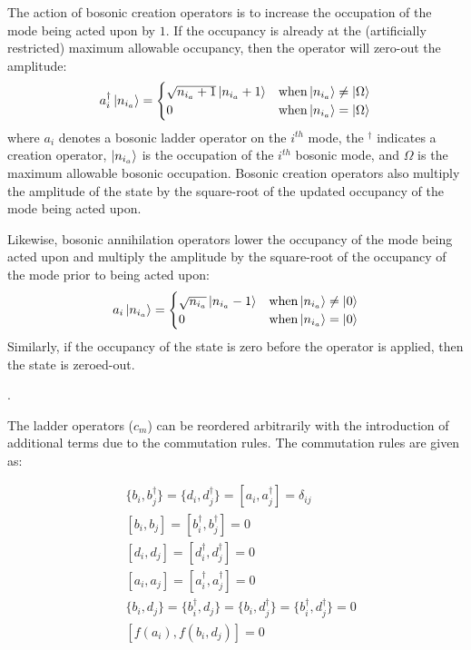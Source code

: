 The action of bosonic creation operators is to increase the occupation of the mode being acted upon by $1$.
If the occupancy is already at the (artificially restricted) maximum allowable occupancy, then the operator will zero-out the amplitude:
\begin{equation}
    \label{eq:bosonic-creation}
    a_i^\dagger \ket{n_{i_a}} = 
    \begin{cases} 
        \sqrt{n_{i_a} + 1} \ket{n_{i_a} + 1}  & {\rm when} \ket{n_{i_a}} \neq \ket{\Omega} \\
        0 & {\rm when} \ket{n_{i_a}} = \ket{\Omega}
    \end{cases}
\end{equation}
where $a_i$ denotes a bosonic ladder operator on the $i^{th}$ mode, the $^\dagger$ indicates a creation operator, $\ket{n_{i_a}}$ is the occupation of the $i^{th}$ bosonic mode, and $\Omega$ is the maximum allowable bosonic occupation.
Bosonic creation operators also multiply the amplitude of the state by the square-root of the updated occupancy of the mode being acted upon.

Likewise, bosonic annihilation operators lower the occupancy of the mode being acted upon and multiply the amplitude by the square-root of the occupancy of the mode prior to being acted upon:
\begin{equation}
    \label{eq:bosonic-annihilation}
    a_i \ket{n_{i_a}} = 
    \begin{cases} 
        \sqrt{n_{i_a}} \ket{n_{i_a} - 1}  & {\rm when} \ket{n_{i_a}} \neq \ket{0} \\
        0 & {\rm when} \ket{n_{i_a}} = \ket{0}
    \end{cases}
\end{equation}
Similarly, if the occupancy of the state is zero before the operator is applied, then the state is zeroed-out.

.

The ladder operators ($c_m$) can be reordered arbitrarily with the introduction of additional terms due to the commutation rules.
The commutation rules are given as:

\begin{equation}
    \label{eq:commutation}
    \begin{split}
        &\{b_i, b_j^\dagger\} = \{d_i, d_j^\dagger\} = [a_i, a_j^\dagger] = \delta_{ij}\\
        & [b_i, b_j] = [b_i^\dagger, b_j^\dagger] = 0 \\
        & [d_i, d_j] = [d_i^\dagger, d_j^\dagger] = 0 \\
        & [a_i, a_j] = [a_i^\dagger, a_j^\dagger] = 0 \\
        & \{b_i, d_j\} = \{b_i^\dagger, d_j\} = \{b_i, d_j^\dagger\} = \{b_i^\dagger, d_j^\dagger\} = 0\\
        & [f(a_i), f(b_i, d_j)] = 0
    \end{split}
\end{equation}

